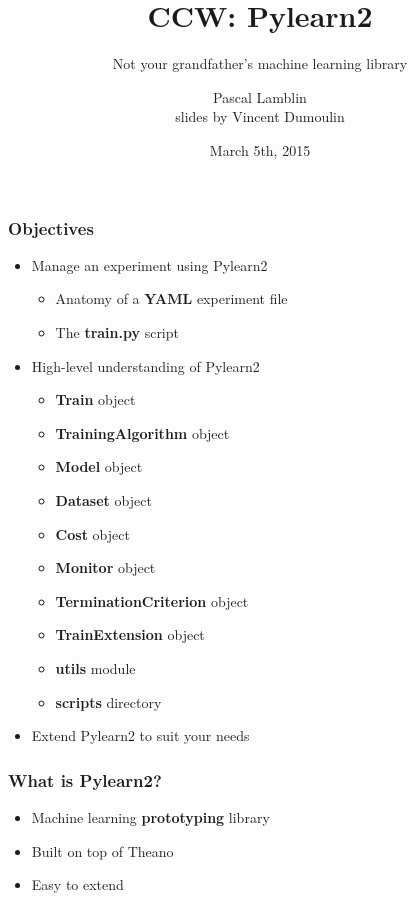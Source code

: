 \documentclass[mathserif, xcolor=dvipsnames]{beamer}
\title{CCW: Pylearn2}
\subtitle{Not your grandfather's machine learning library}
\author{Pascal Lamblin\\
slides by Vincent Dumoulin}
\date{March 5th, 2015}
\begin{document}
\begin{frame}[plain]
    \titlepage
\end{frame}

\begin{frame}
    \frametitle{Objectives}
    \begin{itemize}\addtolength{\itemsep}{0.5\baselineskip}
        \item{
            {\Large Manage an experiment using Pylearn2}
            \begin{itemize}
                \item{Anatomy of a \textbf{YAML} experiment file}
                \item{The \textbf{train.py} script}
            \end{itemize}
        }
        \item{
            {\Large High-level understanding of Pylearn2}
            \begin{itemize}
                \item{\textbf{Train} object}
                \item{\textbf{TrainingAlgorithm} object}
                \item{\textbf{Model} object}
                \item{\textbf{Dataset} object}
                \item{\textbf{Cost} object}
                \item{\textbf{Monitor} object}
                \item{\textbf{TerminationCriterion} object}
                \item{\textbf{TrainExtension} object}
                \item{\textbf{utils} module}
                \item{\textbf{scripts} directory}
            \end{itemize}
        }
        \item{
            {\Large Extend Pylearn2 to suit your needs}
        }
    \end{itemize}
\end{frame}

\begin{frame}
    \frametitle{What is Pylearn2?}
    \begin{itemize}\addtolength{\itemsep}{2.0\baselineskip}
        \item{\LARGE Machine learning \textbf{prototyping} library}
        \item{\LARGE Built on top of Theano}
        \item{\LARGE Easy to extend}
    \end{itemize}
\end{frame}
\end{document}
